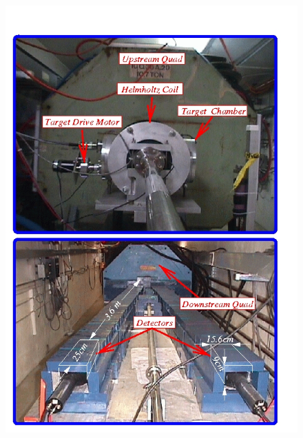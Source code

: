 												
			 \begin{figure}[H]
    			\centering
    			\includegraphics[width=12cm]{CLAS-12/modules/clas-12-system/pics/other/hall-b-poll-2.jpg}
    			\caption{ }
			\end{figure}
			
